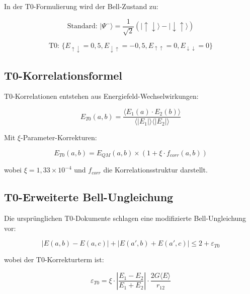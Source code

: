 \documentclass[12pt,a4paper]{article}
\newcommand{\Efield}{E}
\newcommand{\xipar}{\xi}
\begin{document}
	In der T0-Formulierung wird der Bell-Zustand zu:
	
	\begin{equation}
		\text{Standard: } |\Psi^-\rangle = \frac{1}{\sqrt{2}}(|\uparrow\downarrow\rangle - |\downarrow\uparrow\rangle)
	\end{equation}
	
	\begin{equation}
		\text{T0: } \{\Efield_{\uparrow\downarrow} = 0,5, \Efield_{\downarrow\uparrow} = -0,5, \Efield_{\uparrow\uparrow} = 0, \Efield_{\downarrow\downarrow} = 0\}
	\end{equation}
	
	\subsection{T0-Korrelationsformel}
	
	T0-Korrelationen entstehen aus Energiefeld-Wechselwirkungen:
	
	\begin{equation}
		E_{T0}(a,b) = \frac{\langle \Efield_1(a) \cdot \Efield_2(b) \rangle}{\langle |\Efield_1| \rangle \langle |\Efield_2| \rangle}
	\end{equation}
	
	Mit $\xipar$-Parameter-Korrekturen:
	
	\begin{equation}
		E_{T0}(a,b) = E_{QM}(a,b) \times (1 + \xipar \cdot f_{corr}(a,b))
	\end{equation}
	
	wobei $\xipar = 1,33 \times 10^{-4}$ und $f_{corr}$ die Korrelationsstruktur darstellt.
	
	\subsection{T0-Erweiterte Bell-Ungleichung}
	
	Die ursprünglichen T0-Dokumente schlagen eine modifizierte Bell-Ungleichung vor:
	
	\begin{equation}
		|E(a,b) - E(a,c)| + |E(a',b) + E(a',c)| \leq 2 + \varepsilon_{T0}
	\end{equation}
	
	wobei der T0-Korrekturterm ist:
	
	\begin{equation}
		\varepsilon_{T0} = \xipar \cdot \left|\frac{E_1 - E_2}{E_1 + E_2}\right| \cdot \frac{2G\langle E \rangle}{r_{12}}
	\end{equation}
	
\end{document}
